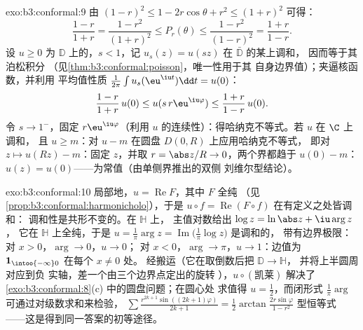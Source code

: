 \begin{solution}{exo:b3:conformal:9}
由 $(1-r)^2 \leq 1 - 2r\cos\theta + r^2 \leq (1+r)^2$ 可得：
\[
\frac{1-r}{1+r} = \frac{1 - r^2}{(1+r)^2} \leq P_r(\theta)
\leq \frac{1 - r^2}{(1 - r)^2} = \frac{1+r}{1-r} .
\]
设 $u \geq 0$ 为 $\mathbb D$ 上的，$s < 1$，记 $u_s(z) =
u(sz)$ 在 $\bar{\mathbb D}$ 的某上调和，
因而等于其泊松积分
（见\cref{thm:b3:conformal:poisson}，唯一性用于其
自身边界值）；夹逼核函数，并利用
平均值性质 $\frac1{2\pi}\int u_s(\eu^{\iu t})\dd t = u(0)$：
\[
\frac{1-r}{1+r}\,u(0) \leq u(s\,r\eu^{\iu\varphi}) \leq
\frac{1+r}{1-r}\,u(0).
\]
令 $s \to 1^-$，固定 $r\eu^{\iu\varphi}$（利用
$u$ 的连续性）：得哈纳克不等式。若 $u$ 在 $\C$ 上调和，
且 $u \geq m$：对 $u - m$ 在圆盘 $D(0, R)$ 上应用哈纳克不等式，
即对 $z \mapsto u(Rz) - m$：固定 $z$，并取 $r =
\abs z/R \to 0$，两个界都趋于 $u(0) - m$：$u(z) =
u(0)$——为常值（由单侧界推出的双侧
刘维尔型结论）。
\end{solution}

\begin{solution}{exo:b3:conformal:10}
局部地，$u = \operatorname{Re}F$，其中 $F$ 全纯
（见\cref{prop:b3:conformal:harmonicholo}），于是 $u\circ f =
\operatorname{Re}(F\circ f)$ 在有定义之处皆调和：
调和性是共形不变的。在 $\mathbb H$ 上，
主值对数给出 $\log z = \ln\abs z + \iu\arg z$，
它在 $\mathbb H$ 上全纯，于是 $u = \frac1\pi\arg z =
\operatorname{Im}\bigl(\frac1\pi\log z\bigr)$ 是调和的，
带有边界极限：对 $x > 0$，$\arg \to 0$，$u \to 0$；
对 $x < 0$，$\arg \to \pi$，$u \to 1$：边值为 $\mathbf
1_{\intoo{-\infty}0}$ 在每个 $x \neq 0$ 处。
经搬运（它在取倒数后把 $\mathbb D \to \mathbb H$，
并将上半圆周对应到负
实轴，差一个由三个边界点定出的旋转
），$u\circ(\text{凯莱})$ 解决了
\cref{exo:b3:conformal:8}(c) 中的圆盘问题；在圆心处
求值得 $u = \frac12$，而闭形式
$\frac1\pi\arg$ 可通过对级数求和来检验，
$\sum\frac{r^{2k+1}\sin((2k+1)\varphi)}{2k+1} =
\frac12\arctan\frac{2r\sin\varphi}{1 - r^2}$ 型恒等式
——这是得到同一答案的初等途径。
\end{solution}

